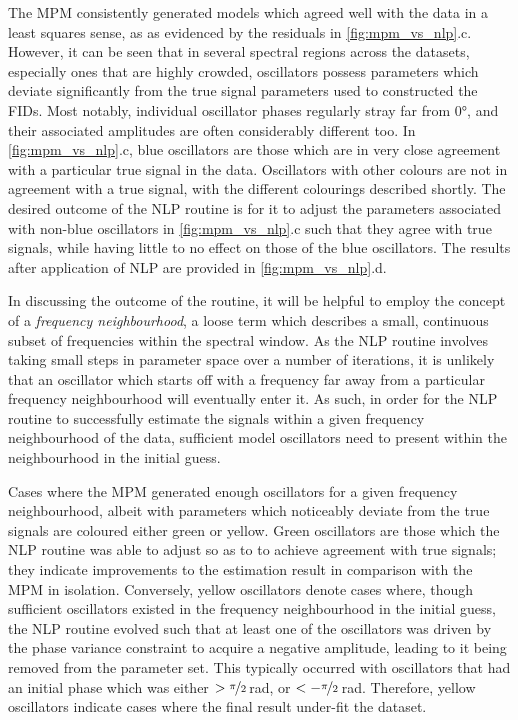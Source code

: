 The \ac{MPM} consistently generated models which agreed well with the data
in a least squares sense, as as evidenced by the residuals in
\cref{fig:mpm_vs_nlp}.c.
However, it can be seen that in several spectral regions across the datasets,
especially ones that are highly crowded, oscillators possess parameters which
deviate significantly from the true signal parameters used to constructed the
\acp{FID}.
Most notably, individual oscillator phases regularly stray far from \ang{0},
and their associated amplitudes are often considerably different too.
In \cref{fig:mpm_vs_nlp}.c, blue oscillators are those which
are in very close agreement with a particular true signal in the data.
Oscillators with other colours are not in agreement with a true signal,
with the different colourings described shortly.
The desired outcome of the \ac{NLP} routine is for it to adjust the
parameters associated with non-blue oscillators in \cref{fig:mpm_vs_nlp}.c such
that they agree with true signals, while having little to no effect on those of
the blue oscillators. The results after application of \ac{NLP} are provided in
\cref{fig:mpm_vs_nlp}.d.

In discussing the outcome of the routine, it will be helpful to employ the
concept of a \emph{frequency neighbourhood}, a loose term which describes a
small, continuous subset of frequencies within the spectral window. As the
\ac{NLP} routine involves taking small steps
in parameter space over a number of iterations, it is unlikely that an
oscillator which starts off with a frequency far away from a particular
frequency neighbourhood will eventually enter it. As such, in order for the
\ac{NLP} routine to successfully estimate the signals within a given frequency
neighbourhood of the data, sufficient model oscillators need to present within
the neighbourhood in the initial guess.

Cases where the
\ac{MPM} generated enough oscillators for a given frequency neighbourhood,
albeit with parameters which noticeably deviate from the true signals are
coloured either green or yellow. Green oscillators are those which the \ac{NLP} routine
was able to adjust so as to to achieve agreement with true signals;
they indicate improvements to the estimation result in comparison with the \ac{MPM}
in isolation. Conversely, yellow oscillators denote cases where, though
sufficient oscillators existed in the frequency neighbourhood in the initial
guess, the \ac{NLP} routine evolved such that at least one of the oscillators
was driven by the phase variance constraint to acquire a negative amplitude,
leading to it being removed from the parameter set. This typically occurred with
oscillators that had an initial phase which was either $>
\nicefrac{\pi}{2}$\,\unit{\radian}, or $< -\nicefrac{\pi}{2}$\,\unit{\radian}.
Therefore, yellow oscillators indicate cases where the final result
under-fit the dataset.

